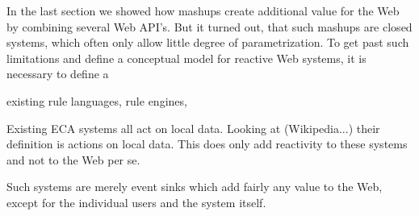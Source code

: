 







In the last section we showed how mashups create additional value for the Web by combining several Web API's.
But it turned out, that such mashups are closed systems, which often only allow little degree of parametrization.
To get past such limitations and define a conceptual model for reactive Web systems, it is necessary to define a 

existing rule languages, rule engines, 

Existing ECA systems all act on local data.
Looking at (Wikipedia...) their definition is actions on local data.
This does only add reactivity to these systems and not to the Web per se.

Such systems are merely event sinks which add fairly any value to the Web, except for the individual users and the system itself.


